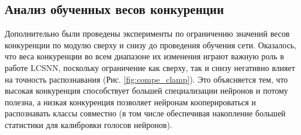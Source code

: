 \documentclass[a4paper]{article}
\begin{document}
\subsection{Анализ обученных весов конкуренции}
Дополнительно были проведены эксперименты по ограничению значений весов конкуренции по модулю сверху и снизу до проведения обучения сети. Оказалось, что веса конкуренции во всем диапазоне их изменения играют важную роль в работе LCSNN, поскольку ограничение как сверху, так и снизу негативно влияет на точность распознавания (Рис. \ref{fig:compe_clamp}). Это объясняется тем, что высокая конкуренция способствует большей специализации нейронов и потому полезна, а низкая конкуренция позволяет нейронам кооперироваться и распознавать классы совместно (в том числе обеспечивая накопление большей статистики для калибровки голосов нейронов).
\end{document}
